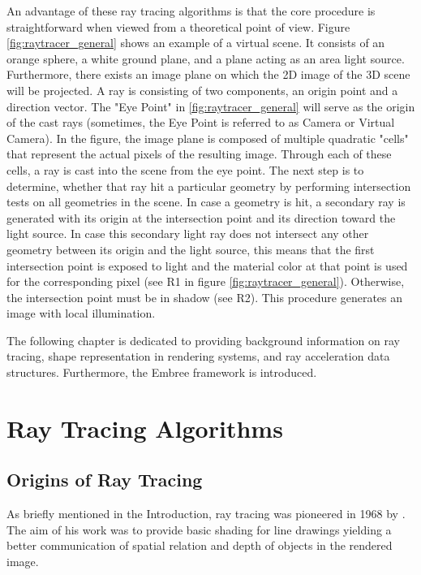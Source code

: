 An advantage of these ray tracing algorithms is that the core procedure is straightforward when viewed from a theoretical point of view. Figure \ref{fig:raytracer_general} shows an example of a virtual scene. It consists of an orange sphere, a white ground plane, and a plane acting as an area light source. Furthermore, there exists an image plane on which the 2D image of the 3D scene will be projected. A ray is consisting of two components, an origin point and a direction vector. The "Eye Point" in \ref{fig:raytracer_general} will serve as the origin of the cast rays (sometimes, the Eye Point is referred to as Camera or Virtual Camera). In the figure, the image plane is composed of multiple quadratic "cells" that represent the actual pixels of the resulting image. Through each of these cells, a ray is cast into the scene from the eye point. The next step is to determine, whether that ray hit a particular geometry by performing intersection tests on all geometries in the scene. In case a geometry is hit, a secondary ray is generated with its origin at the intersection point and its direction toward the light source. In case this secondary light ray does not intersect any other geometry between its origin and the light source, this means that the first intersection point is exposed to light and the material color at that point is used for the corresponding pixel (see R1 in figure \ref{fig:raytracer_general}). Otherwise, the intersection point must be in shadow (see R2). This procedure generates an image with local illumination.

The following chapter is dedicated to providing background information on ray tracing, shape representation in rendering systems, and ray acceleration data structures. Furthermore, the Embree framework is introduced. 

\section{Ray Tracing Algorithms}


\subsection{Origins of Ray Tracing}
As briefly mentioned in the Introduction, ray tracing was pioneered in 1968 by \cite{appel1968some}. The aim of his work was to provide basic shading for line drawings yielding a better communication of spatial relation and depth of objects in the rendered image.

